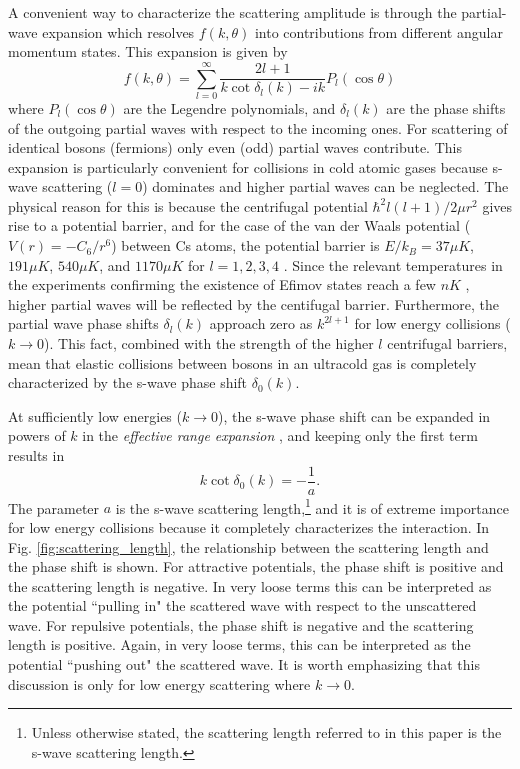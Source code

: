 \documentclass[prl,onecolumn,amsmath,amssymb,titlepage,nofootinbib,preprint]{revtex4-1}
\begin{document}
	A convenient way to characterize the scattering amplitude is through the partial-wave expansion which resolves $f(k,\theta)$ into contributions from different angular momentum states.  This expansion is given by
	\begin{equation}\label{eq:partial_wave_expansion}
		f(k,\theta)=\sum\limits_{l=0}^{\infty}\frac{2l+1}{k\cot{\delta_{l}(k)}-ik}P_{l}(\cos\theta)
	\end{equation}
	where $P_{l}(\cos\theta)$ are the Legendre polynomials, and $\delta_{l}(k)$ are the phase shifts of the outgoing partial waves with respect to the incoming ones.  For scattering of identical bosons (fermions) only even (odd) partial waves contribute.  This expansion is particularly convenient for collisions in cold atomic gases because s-wave scattering ($l=0$) dominates and higher partial waves can be neglected.  The physical reason for this is because the centrifugal potential $\hbar^{2}l(l+1)/2\mu r^{2}$ gives rise to a potential barrier, and for the case of the van der Waals potential ($V(r)=-C_{6}/r^{6}$) between Cs atoms, the potential barrier is $E/k_{B}=37\mu K$, $191\mu K$, $540\mu K$, and $1170\mu K$ for $l=1,2,3,4$ \cite{Chin2001}.  Since the relevant temperatures in the experiments confirming the existence of Efimov states reach a few $nK$ \cite{Huang2014}, higher partial waves will be reflected by the centifugal barrier.  Furthermore, the partial wave phase shifts $\delta_{l}(k)$ approach zero as $k^{2l+1}$ for low energy collisions ($k\rightarrow 0$).  This fact, combined with the strength of the higher $l$ centrifugal barriers, mean that elastic collisions between bosons in an ultracold gas is completely characterized by  the s-wave phase shift $\delta_{0}(k)$.

	At sufficiently low energies ($k\rightarrow 0$), the s-wave phase shift can be expanded in powers of $k$ in the \textit{effective range expansion} \cite{Chin2001}\cite{landau1977quantum}, and keeping only the first term results in
	\begin{equation}\label{eq:scattering_length_defined}
		k\cot\delta_{0}(k)=-\frac{1}{a}.
	\end{equation}
	The parameter $a$ is the s-wave scattering length,\footnote{Unless otherwise stated, the scattering length referred to in this paper is the s-wave scattering length.} and it is of extreme importance for low energy collisions because it completely characterizes the interaction.  In Fig. \ref{fig:scattering_length}, the relationship between the scattering length and the phase shift is shown.  For attractive potentials, the phase shift is positive and the scattering length is negative.  In very loose terms this can be interpreted as the potential ``pulling in" the scattered wave with respect to the unscattered wave.  For repulsive potentials, the phase shift is negative and the scattering length is positive.  Again, in very loose terms, this can be interpreted as the potential ``pushing out" the scattered wave.  It is worth emphasizing that this discussion is only for low energy scattering where $k\rightarrow 0$.
	
\end{document}
